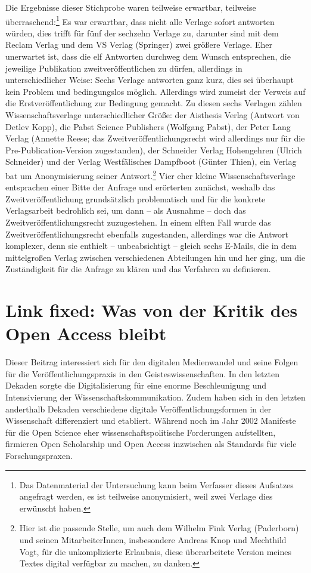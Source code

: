 \documentclass[a4paper,
fontsize=11pt,
oneside,
numbers=noperiodatend,
parskip=half-,
bibliography=totoc,
final
]{scrartcl}
\begin{document}
Die Ergebnisse dieser Stichprobe waren teilweise erwartbar, teilweise
überraschend:\footnote{Das Datenmaterial der Untersuchung kann beim
  Verfasser dieses Aufsatzes angefragt werden, es ist teilweise
  anonymisiert, weil zwei Verlage dies erwünscht haben.} Es war
erwartbar, dass nicht alle Verlage sofort antworten würden, dies trifft
für fünf der sechzehn Verlage zu, darunter sind mit dem Reclam Verlag
und dem VS Verlag (Springer) zwei größere Verlage. Eher unerwartet ist,
dass die elf Antworten durchweg dem Wunsch entsprechen, die jeweilige
Publikation zweitveröffentlichen zu dürfen, allerdings in
unterschiedlicher Weise: Sechs Verlage antworten ganz kurz, dies sei
überhaupt kein Problem und bedingungslos möglich. Allerdings wird
zumeist der Verweis auf die Erstveröffentlichung zur Bedingung gemacht.
Zu diesen sechs Verlagen zählen Wissenschaftsverlage unterschiedlicher
Größe: der Aisthesis Verlag (Antwort von Detlev Kopp), die Pabst Science
Publishers (Wolfgang Pabst), der Peter Lang Verlag (Annette Reese; das
Zweitveröffentlichungsrecht wird allerdings nur für die
Pre-Publication-Version zugestanden), der Schneider Verlag Hohengehren
(Ulrich Schneider) und der Verlag Westfälisches Dampfboot (Günter
Thien), ein Verlag bat um Anonymisierung seiner Antwort.\footnote{Hier
  ist die passende Stelle, um auch dem Wilhelm Fink Verlag (Paderborn)
  und seinen MitarbeiterInnen, insbesondere Andreas Knop und Mechthild
  Vogt, für die unkomplizierte Erlaubnis, diese überarbeitete Version
  meines Textes digital verfügbar zu machen, zu danken.} Vier eher
kleine Wissenschaftsverlage entsprachen einer Bitte der Anfrage und
erörterten zunächst, weshalb das Zweitveröffentlichung grundsätzlich
problematisch und für die konkrete Verlagsarbeit bedrohlich sei, um dann
-- als Ausnahme -- doch das Zweitveröffentlichungsrecht zuzugestehen. In
einem elften Fall wurde das Zweitveröffentlichungsrecht ebenfalls
zugestanden, allerdings war die Antwort komplexer, denn sie enthielt --
unbeabsichtigt -- gleich sechs E-Mails, die in dem mittelgroßen Verlag
zwischen verschiedenen Abteilungen hin und her ging, um die
Zuständigkeit für die Anfrage zu klären und das Verfahren zu definieren.

\section*{Link fixed: Was von der Kritik des Open Access
bleibt}\label{link-fixed-was-von-der-kritik-des-open-access-bleibt}

Dieser Beitrag interessiert sich für den digitalen Medienwandel und
seine Folgen für die Veröffentlichungspraxis in den
Geisteswissenschaften. In den letzten Dekaden sorgte die Digitalisierung
für eine enorme Beschleunigung und Intensivierung der
Wissenschaftskommunikation. Zudem haben sich in den letzten anderthalb
Dekaden verschiedene digitale Veröffentlichungsformen in der
Wissenschaft differenziert und etabliert. Während noch im Jahr 2002
Manifeste für die Open Science eher wissenschaftspolitische Forderungen
aufstellten, firmieren Open Scholarship und Open Access inzwischen als
Standards für viele Forschungspraxen.
\end{document}
